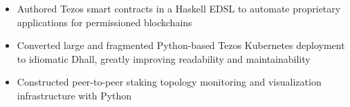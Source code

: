 \documentclass[10pt,a4paper]{altacv}
\newenvironment{tightitemize} %
{\begin{itemize}\itemsep1pt \parskip0pt \parsep0pt}
{\end{itemize}\vspace{-\topsep}}
\begin{document}

\begin{fullwidth}
\makecvheader
\end{fullwidth}



\begin{tightitemize}
    \item Authored Tezos smart contracts in a Haskell EDSL to automate 
      proprietary applications for permissioned blockchains
    \item Converted large and fragmented Python-based Tezos Kubernetes
      deployment to idiomatic Dhall, greatly improving readability and 
      maintainability
    \item Constructed peer-to-peer staking topology monitoring and visualization 
        infrastructure with Python
\end{tightitemize}

\smallskip
\divider
\end{document}
